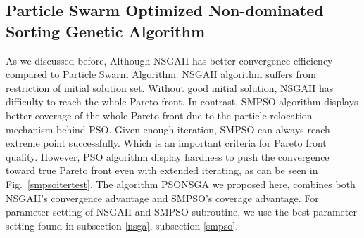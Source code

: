 \documentclass[10pt,journal,compsoc]{IEEEtran}
\newcommand{\Fig}[1]{Fig.~\ref{#1}}
\begin{document}
\subsection{Particle Swarm Optimized Non-dominated Sorting Genetic Algorithm}\label{psonsga}
As we discussed before, Although NSGAII has better convergence efficiency compared to Particle Swarm Algorithm. NSGAII algorithm suffers from restriction of initial solution set. Without good initial solution, NSGAII has difficulty to reach the whole Pareto front. In contrast, SMPSO algorithm displays better coverage of the whole Pareto front due to the particle relocation mechanism behind PSO. Given enough iteration, SMPSO can always reach extreme point successfully. Which is an important criteria for Pareto front quality. However, PSO algorithm display hardness to push the convergence toward true Pareto front even with extended iterating, as can be seen in \Fig{smpsoitertest}.
The algorithm PSONSGA we proposed here, combines both NSGAII's convergence advantage and SMPSO's coverage advantage. 
For parameter setting of NSGAII and SMPSO subroutine, we use the best parameter setting found in subsection \ref{nsga}, subsection \ref{smpso}.
\end{document}
